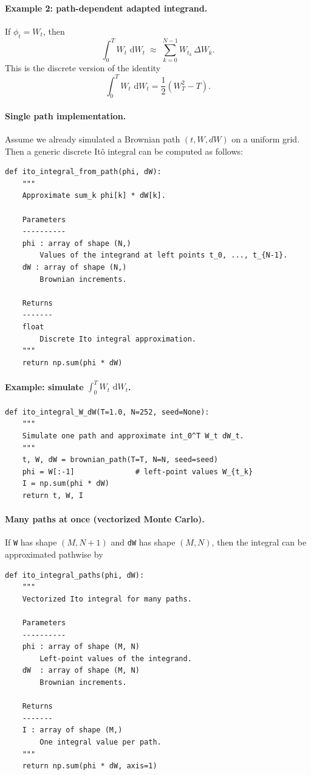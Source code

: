 \documentclass[11pt]{article}
\newcommand{\dd}{\,\mathrm{d}}
\newcommand{\1}{\mathbf{1}}
\theoremstyle{plain}
\theoremstyle{definition}
\theoremstyle{remark}
\begin{document}
\paragraph{Example 2: path-dependent adapted integrand.}
If $\phi_t=W_t$, then
\[
\int_0^T W_t\,\dd W_t
\;\approx\;
\sum_{k=0}^{N-1} W_{t_k}\,\Delta W_k.
\]
This is the discrete version of the identity
\[
\int_0^T W_t\,\dd W_t = \frac12(W_T^2-T).
\]

\paragraph{Single path implementation.}
Assume we already simulated a Brownian path $(t,W,dW)$ on a uniform grid.
Then a generic discrete It\^o integral can be computed as follows:
\begin{verbatim}
def ito_integral_from_path(phi, dW):
    """
    Approximate sum_k phi[k] * dW[k].

    Parameters
    ----------
    phi : array of shape (N,)
        Values of the integrand at left points t_0, ..., t_{N-1}.
    dW : array of shape (N,)
        Brownian increments.

    Returns
    -------
    float
        Discrete Ito integral approximation.
    """
    return np.sum(phi * dW)
\end{verbatim}

\paragraph{Example: simulate \texorpdfstring{$\int_0^T W_t\,\dd W_t$}{∫ W_t dW_t}.}
\begin{verbatim}
def ito_integral_W_dW(T=1.0, N=252, seed=None):
    """
    Simulate one path and approximate int_0^T W_t dW_t.
    """
    t, W, dW = brownian_path(T=T, N=N, seed=seed)
    phi = W[:-1]              # left-point values W_{t_k}
    I = np.sum(phi * dW)
    return t, W, I
\end{verbatim}

\paragraph{Many paths at once (vectorized Monte Carlo).}
If \texttt{W} has shape $(M,N+1)$ and \texttt{dW} has shape $(M,N)$, then
the integral can be approximated pathwise by
\begin{verbatim}
def ito_integral_paths(phi, dW):
    """
    Vectorized Ito integral for many paths.

    Parameters
    ----------
    phi : array of shape (M, N)
        Left-point values of the integrand.
    dW  : array of shape (M, N)
        Brownian increments.

    Returns
    -------
    I : array of shape (M,)
        One integral value per path.
    """
    return np.sum(phi * dW, axis=1)
\end{verbatim}
\end{document}
